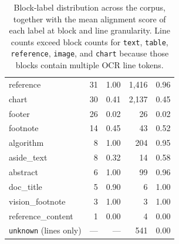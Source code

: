 \documentclass{article}
\theoremstyle{definition}
\begin{document}
\begin{table}[h]
\begin{tabular}{lrrrr}
            reference                     & 31              & 1.00                & 1{,}416        & 0.96               \\
            chart                         & 30              & 0.41                & 2{,}137        & 0.45               \\
            footer                        & 26              & 0.02                & 26             & 0.02               \\
            footnote                      & 14              & 0.45                & 43             & 0.52               \\
            algorithm                     & 8               & 1.00                & 204            & 0.95               \\
            aside\_text                   & 8               & 0.32                & 14             & 0.58               \\
            abstract                      & 6               & 1.00                & 99             & 0.96               \\
            doc\_title                    & 5               & 0.90                & 6              & 1.00               \\
            vision\_footnote              & 3               & 1.00                & 3              & 1.00               \\
            reference\_content            & 1               & 0.00                & 4              & 0.00               \\
            \texttt{unknown} (lines only) & ---             & ---                 & 541            & 0.00               \\
            \bottomrule
      \end{tabular}
      \caption{Block-label distribution across the corpus, together with
            the mean alignment score of each label at block and line
            granularity.  Line counts exceed block counts for \texttt{text},
            \texttt{table}, \texttt{reference}, \texttt{image}, and
            \texttt{chart} because those blocks contain multiple OCR line
            tokens.}
      \label{tab:bench-labels}
\end{table}
\end{document}
